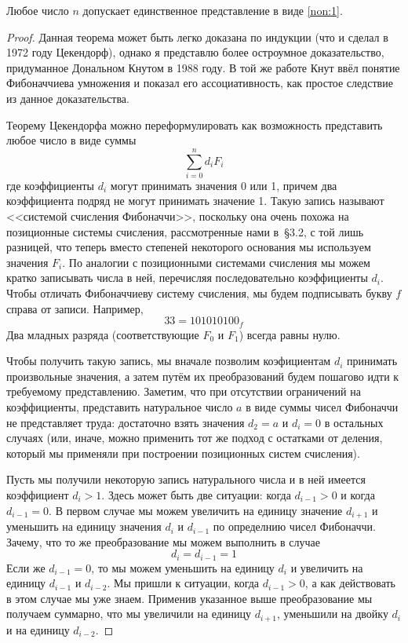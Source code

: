 \begin{thm}
Любое число $n$ допускает единственное представление в виде \eqref{non:1}.
\end{thm}
\begin{proof}
Данная теорема может быть легко доказана по индукции (что и сделал в 1972 году Цекендорф), однако я представлю более остроумное доказательство, придуманное Дональном Кнутом в 1988 году. В той же работе Кнут ввёл понятие Фибоначчиева умножения и показал его ассоциативность, как простое следствие из данное доказательства.

Теорему Цекендорфа можно переформулировать как возможность представить любое число в виде суммы
$$\sum_{i=0}^n d_iF_i$$
где коэффициенты $d_i$ могут принимать значения 0 или 1, причем два коэффициента подряд не могут принимать значение 1. Такую запись называют <<системой счисления Фибоначчи>>, поскольку она очень похожа на позиционные системы счисления, рассмотренные нами в~\S3.2, с той лишь разницей, что теперь вместо степеней некоторого основания мы используем значения $F_i$. По аналогии с позиционными системами счисления мы можем кратко записывать числа в ней, перечисляя последовательно коэффициенты $d_i$. Чтобы отличать Фибоначчиеву систему счисления, мы будем подписывать букву $f$ справа от записи. Например,
$$33 = 101010100_f$$
Два младных разряда (соответствующие $F_0$ и $F_1$) всегда равны нулю.

Чтобы получить такую запись, мы вначале позволим коэфициентам $d_i$ принимать произвольные значения, а затем путём их преобразований будем пошагово идти к требуемому представлению. Заметим, что при отсутствии ограничений на коэффициенты, представить натуральное число $a$ в виде суммы чисел Фибоначчи не представляет труда: достаточно взять значения $d_2 = a$ и $d_i = 0$ в остальных случаях (или, иначе, можно применить тот же подход с остатками от деления, который мы применяли при построении позиционных систем счисления).

Пусть мы получили некоторую запись натурального числа и в ней имеется коэффициент $d_i > 1$. Здесь может быть две ситуации: когда $d_{i-1}> 0$ и когда $d_{i-1} = 0$. В первом случае мы можем увеличить на единицу значение $d_{i+1}$ и уменьшить на единицу значения $d_i$ и $d_{i-1}$ по определнию чисел Фибоначчи. Зачему, что то же преобразование мы можем выполнить в случае
$$d_i = d_{i-1} = 1$$
Если же $d_{i-1} = 0$, то мы можем уменьшить на единицу $d_i$ и увеличить на единицу $d_{i-1}$ и $d_{i-2}$. Мы пришли к ситуации, когда $d_{i-1} > 0$, а как действовать в этом случае мы уже знаем. Применив указанное выше преобразование мы получаем суммарно, что мы увеличили на единицу $d_{i+1}$, уменьшили на двойку $d_i$ и на единицу $d_{i-2}$.


\end{proof}
